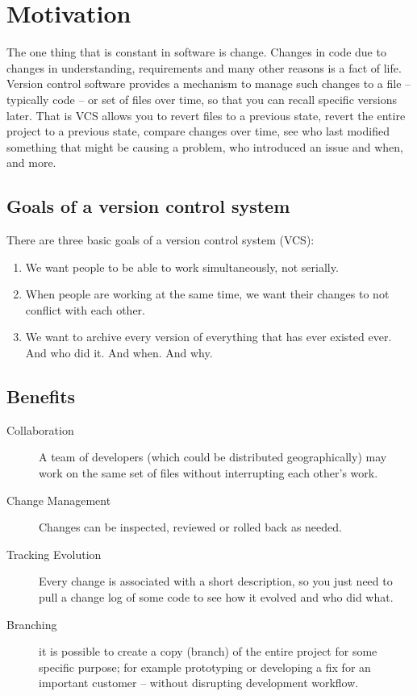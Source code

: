 \documentclass[11pt,a4paper]{article}
\author{TalentSprint}
\date{}
\begin{document}
\section*{Motivation}
The one thing that is constant in software is change. Changes in code due to changes in understanding, requirements and many other reasons is a fact of life. Version control software provides a mechanism to manage such changes to a file -- typically code -- or set of files over time,  so that you can recall specific versions later. That is VCS allows you to revert files to a previous state, revert the entire project to a previous state, compare changes over time, see who last modified something that might be causing a problem, who introduced an issue and when, and more. 

\subsection*{Goals of a version control system}
There are three basic goals of a version control system (VCS):
\begin{enumerate}
\item We want people to be able to work simultaneously, not serially.
\item When people are working at the same time, we want their changes to not conflict with each other.
\item We want to archive every version of everything that has ever existed ever.  And who did it. And when. And why.
\end{enumerate}

\subsection*{Benefits}
\begin{description}
\item [Collaboration]  A team of developers (which could be distributed geographically) may work on the same set of files without interrupting each other's work.
\item [Change Management]  Changes can be inspected, reviewed or rolled back as needed.
\item [Tracking Evolution]  Every change is associated with a short description, so you just need to pull a change log of some code to see how it evolved and who did what.
\item [Branching] it is possible to create a copy (branch) of the entire project for some specific purpose; for example prototyping or developing a fix for an important customer -- without disrupting development workflow.
\end{description}
\end{document}
